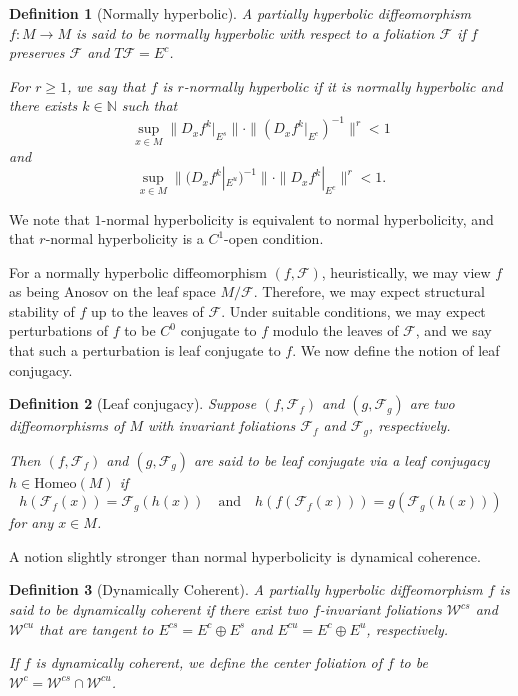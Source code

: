 \documentclass[11pt]{amsart}
\numberwithin{equation}{section}
\newcommand{\N}{\mathbb{N}}
\newcommand{\W}{\mathcal{W}}
\theoremstyle{plain}
\newtheorem{defi}{Definition}[section]
\begin{document}
\begin{defi}[Normally hyperbolic]
A partially hyperbolic diffeomorphism $f:M\to M$ is said to be \emph{normally hyperbolic} with respect to a foliation $\mathcal{F}$ if $f$ preserves $\mathcal{F}$ and $T\mathcal{F}=E^c$.

For $r\ge 1$, we say that $f$ is \emph{$r$-normally hyperbolic} if it is normally hyperbolic and there exists $k\in \N$ such that
\[
\sup_{x\in M}\|D_xf^k|_{E^s}\|\cdot \|(D_xf^k|_{E^c})^{-1}\|^r<1
\]
and
\[
\sup_{x\in M}\|(D_xf^k|_{E^u})^{-1}\|\cdot \|D_xf^{k}|_{E^c}\|^r<1.
\]
\end{defi}

We note that $1$-normal hyperbolicity is equivalent to normal hyperbolicity, and that $r$-normal hyperbolicity is a $C^1$-open condition.

For a normally hyperbolic diffeomorphism $(f,\mathcal{F})$, heuristically, we may view $f$ as being Anosov on the leaf space $M/\mathcal{F}$. Therefore, we may expect structural stability of $f$ up to the leaves of $\mathcal{F}$. Under suitable conditions, we may expect perturbations of $f$ to be $C^0$ conjugate to $f$ modulo the leaves of $\mathcal{F}$, and we say that such a perturbation is leaf conjugate to $f$. We now define the notion of leaf conjugacy.

\begin{defi}[Leaf conjugacy]
Suppose $(f,\mathcal{F}_f)$ and $(g,\mathcal{F}_g)$ are two diffeomorphisms of $M$ with invariant foliations $\mathcal{F}_f$ and $\mathcal{F}_g$, respectively.

Then $(f,\mathcal{F}_f)$ and $(g,\mathcal{F}_g)$ are said to be \emph{leaf conjugate} via a leaf conjugacy $h\in \mathrm{Homeo}(M)$ if
\[
h(\mathcal{F}_f(x))=\mathcal{F}_g(h(x)) \quad \text{and} \quad
h(f(\mathcal{F}_f(x)))=g(\mathcal{F}_g(h(x)))
\]
for any $x\in M$.
\end{defi}

A notion slightly stronger than normal hyperbolicity is dynamical coherence.

\begin{defi}[Dynamically Coherent]
A partially hyperbolic diffeomorphism $f$ is said to be \emph{dynamically coherent} if there exist two $f$-invariant foliations $\W^{cs}$ and $\W^{cu}$ that are tangent to $E^{cs}=E^c\oplus E^s$ and $E^{cu}=E^c\oplus E^u$, respectively.

If $f$ is dynamically coherent, we define the center foliation of $f$ to be $\W^c=\W^{cs}\cap \W^{cu}$.
\end{defi}
\end{document}
